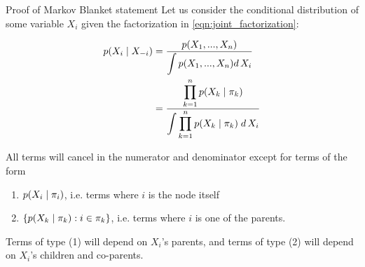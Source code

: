 \documentclass[10pt]{beamer}
\begin{document}
\begin{frame}{Proof of Markov Blanket statement}
Let us consider the conditional distribution of some variable $X_i$ given the factorization in \eqref{eqn:joint_factorization}:

\begin{align*}
 p(X_i  \; | \; X_{-i}) &= \displaystyle\frac{ p(X_1, ..., X_n)}{ \displaystyle\int  p(X_1, ..., X_n) d\, X_i} \\
 &= \displaystyle\frac{\displaystyle\prod_{k=1}^n p(X_k \; | \; \pi_k)}{\displaystyle\int \displaystyle\prod_{k=1}^n p(X_k \; | \; \pi_k) \; d\,X_i }
 \end{align*}
 
All terms will cancel in the numerator and denominator except for terms of the form
\begin{enumerate}
\item $p(X_i \; | \; \pi_i)$, i.e. terms where $i$ is the node itself
\item $\{p(X_k \; | \; \pi_k) : i \in \pi_k \} $, i.e. terms where $i$ is one of the parents.
\end{enumerate}

Terms of type (1) will depend on $X_i$'s parents, and terms of type (2) will depend on $X_i$'s children and co-parents.

\end{frame}
 
\end{document}
